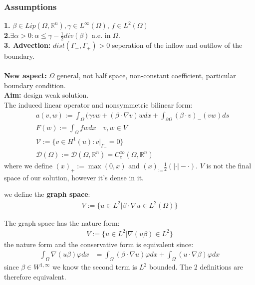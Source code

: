 \subsubsection*{Assumptions}
\textbf{1.} $\beta \in Lip(\Omega, \mathbb{R}^n), \gamma \in L^\infty(\Omega)$, $f \in L^2(\Omega)$\\
\textbf{2.}$\exists \alpha > 0: \alpha \le \gamma - \frac{1}{2} div (\beta)$ a.e. in $\Omega$. \\
\textbf{3. Advection: } $dist(\Gamma_-, \Gamma_+ )> 0$ seperation of the inflow and outflow of the boundary. \\


\quad\\
\textbf{New aspect:} $\Omega$ general, not half space, non-constant coefficient, particular boundary condition. \\
\textbf{Aim:} design weak solution. \\
The induced linear operator and nonsymmetric bilinear form:
\begin{align*}
		&a(v,w) := \int_\Omega (\gamma v w + (\beta \cdot \nabla v)w dx + \int_{\partial\Omega}(\beta \cdot v)_- (v w)   ds\\
		&F(w) := \int_\Omega fw dx  \quad v, w \in V \\
	&\mathcal{V} := \{v \in H^1(u) : v|_{\Gamma_-} = 0\}\\
	&\mathcal{D}(\Omega) := \mathcal{D}(\Omega, \mathbb{R}^n) = C^\infty_c(\Omega, \mathbb{R}^n) 
\end{align*}
where we define $(x)_+:= \max(0, x)$ and $(x)_:= \frac{1}{2}(|\cdot| - \cdot)$.  $V$ is not the final space of our solution, however it's dense in it.

\begin{definition}
	we define the \textbf{graph space}:
	\begin{align*}
		V:= \{ u \in L^2| \beta \cdot \nabla u \in L^2(\Omega)\}
	\end{align*} 
\end{definition}
\begin{remark}
The graph space has the nature form:
\begin{align*}
	V:= \{ u \in L^2| \nabla( u \beta) \in L^2 \}
\end{align*}	
the nature form and the conservative form is equivalent since:
\begin{align*}
	\int_{\Omega} \nabla (u \beta) \varphi dx &= \int_{\Omega}  (\beta \cdot \nabla u)\varphi dx + \int_\Omega (u \cdot \nabla \beta) \varphi dx
\end{align*}
since $\beta \in W^{1, \infty}$ we know the second term is $L^2$ bounded. The 2 definitions are therefore equivalent.
\end{remark}

